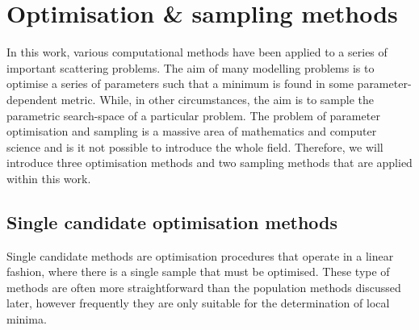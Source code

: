 \section{Optimisation \& sampling methods}
\label{sec:optimisation}
In this work, various computational methods have been applied to a series of important scattering problems.
The aim of many modelling problems is to optimise a series of parameters such that a minimum is found in some parameter-dependent metric.
While, in other circumstances, the aim is to sample the parametric search-space of a particular problem.
The problem of parameter optimisation and sampling is a massive area of mathematics and computer science and is it not possible to introduce the whole field.
Therefore, we will introduce three optimisation methods and two sampling methods that are applied within this work.

\subsection{Single candidate optimisation methods}
\label{sec:singlecan}
Single candidate methods are optimisation procedures that operate in a linear fashion, where there is a single sample that must be optimised.
These type of methods are often more straightforward than the population methods discussed later, however frequently they are only suitable for the determination of local minima.

